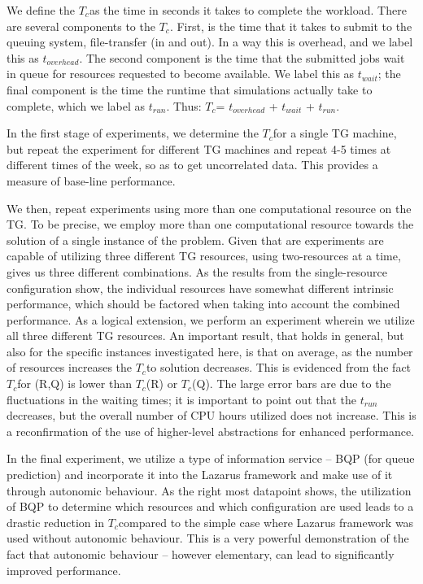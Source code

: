 \documentclass[conference,final]{IEEEtran}
\newcommand{\tc}{$T_c$}
\begin{document}
We define the \tc as the time in seconds it takes to complete the
workload. There are several components to the \tc. First, is the time
that it takes to submit to the queuing system, file-transfer (in and
out). In a way this is overhead, and we label this as $t_{overhead}$.
The second component is the time that the submitted jobs wait in queue
for resources requested to become available. We label this as
$t_{wait}$; the final component is the time the runtime that
simulations actually take to complete, which we label as
$t_{run}$. Thus: \tc = $t_{overhead}$ + $t_{wait}$ + $t_{run}$.

In the first stage of experiments, we determine the \tc for a single
TG machine, but repeat the experiment for different TG machines and
repeat 4-5 times at different times of the week, so as to get
uncorrelated data.  This provides a measure of base-line performance.

We then, repeat experiments using more than one computational resource
on the TG. To be precise, we employ more than one computational
resource towards the solution of a single instance of the problem.
Given that are experiments are capable of utilizing three different TG
resources, using two-resources at a time, gives us three different
combinations. As the results from the single-resource configuration
show, the individual resources have somewhat different intrinsic
performance, which should be factored when taking into account the
combined performance. As a logical extension, we perform an experiment
wherein we utilize all three different TG resources.  An important
result, that holds in general, but also for the specific instances
investigated here, is that on average, as the number of resources
increases the \tc to solution decreases. This is evidenced from the
fact \tc for (R,Q) is lower than \tc (R) or \tc (Q). The large error
bars are due to the fluctuations in the waiting times; it is important
to point out that the $t_{run}$ decreases, but the overall number of
CPU hours utilized does not increase. This is a reconfirmation of
the use of higher-level abstractions for enhanced performance.

In the final experiment, we utilize a type of information service --
BQP (for queue prediction) and incorporate it into the Lazarus
framework and make use of it through autonomic behaviour.  As the
right most datapoint shows, the utilization of BQP to determine which
resources and which configuration are used leads to a drastic
reduction in \tc compared to the simple case where Lazarus framework
was used without autonomic behaviour. This is a very powerful
demonstration of the fact that autonomic behaviour -- however
elementary, can lead to significantly improved performance.
\end{document}
